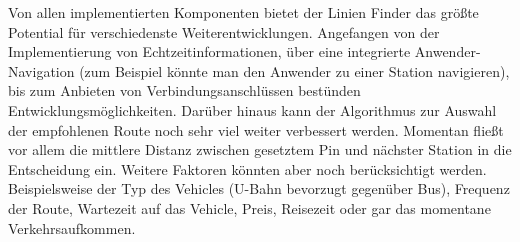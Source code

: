     Von allen implementierten Komponenten bietet der Linien Finder das größte Potential für verschiedenste Weiterentwicklungen. Angefangen von der Implementierung von Echtzeitinformationen, über eine integrierte Anwender-Navigation (zum Beispiel könnte man den Anwender zu einer Station navigieren), bis zum Anbieten von Verbindungsanschlüssen bestünden Entwicklungsmöglichkeiten. Darüber hinaus kann der Algorithmus zur Auswahl der empfohlenen Route noch sehr viel weiter verbessert werden. Momentan fließt vor allem die mittlere Distanz zwischen gesetztem Pin und nächster Station in die Entscheidung ein. Weitere Faktoren könnten aber noch berücksichtigt werden. Beispielsweise der Typ des Vehicles (U-Bahn bevorzugt gegenüber Bus), Frequenz der Route, Wartezeit auf das Vehicle, Preis, Reisezeit oder gar das momentane Verkehrsaufkommen.
    
    
    

